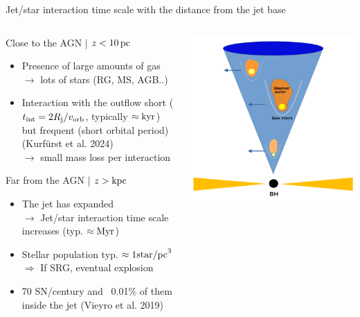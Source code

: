 \begin{frame}{Jet/star interaction time scale with the distance from the jet base}
	\begin{columns}
		{\scriptsize
		\begin{column}{0.5\textwidth}
			\begin{alertblock}{Close to the AGN | $z<10\,{\rm pc}$}
				\begin{itemize}
					\item Presence of large amounts of gas \\
						$\rightarrow$ lots of stars (RG, MS, AGB..) 
					\item Interaction with the outflow short ($t_{\rm int}=2R_{\rm j}/v_{\rm orb}$, typically 
							$\approx {\rm kyr}$)
								but frequent (short orbital period) (Kurfürst et al. 2024)\\
						$\rightarrow$ small mass loss per interaction  \\
				\end{itemize}
			\end{alertblock}
			\begin{block}{Far from the AGN | $z>{\rm kpc}$}
				\begin{itemize}
					\item The jet has expanded \\
							$\rightarrow$ Jet/star interaction time scale increases
								(typ. $\approx{\rm Myr}$)
					\item Stellar population typ. $\approx 1 {\rm star/pc}^{3}$ \\
						$\Rightarrow$ If SRG, eventual explosion
				\item 70 SN/century and ~0.01\% of them inside the jet (Vieyro et al. 2019)
				\end{itemize}
			\end{block}
		\end{column}
		\begin{column}{0.5\textwidth}
			\centering
			\includegraphics[width=\linewidth]{images/jet_mobstacles.png}

\end{column}}
\end{columns}
\end{frame}
